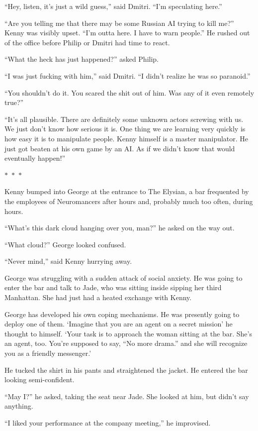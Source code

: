 \documentclass{memoir}
\newcommand{\starbreak}{%
\begin{center}
  $\ast$~$\ast$~$\ast$
\end{center}
}
\begin{document}
``Hey, listen, it's just a wild guess,'' said Dmitri. ``I'm speculating here.''

``Are you telling me that there may be some Russian AI trying to kill me?'' Kenny was visibly upset. ``I'm outta here. I have to warn people.'' He rushed out of the office before Philip or Dmitri had time to react.

``What the heck has just happened?'' asked Philip. 

``I was just fucking with him,'' said Dmitri. ``I didn't realize he was so paranoid.''

``You shouldn't do it. You scared the shit out of him. Was any of it even remotely true?''

``It's all plausible. There are definitely some unknown actors screwing with us. We just don't know how serious it is. One thing we are learning very quickly is how easy it is to manipulate people. Kenny himself is a master manipulator. He just got beaten at his own game by an AI. As if we didn't know that would eventually happen!''

\starbreak

Kenny bumped into George at the entrance to The Elysian, a bar frequented by the employees of Neuromancers after hours and, probably much too often, during hours.

``What's this dark cloud hanging over you, man?'' he asked on the way out.

``What cloud?'' George looked confused.

``Never mind,'' said Kenny hurrying away.

George was struggling with a sudden attack of social anxiety. He was going to enter the bar and talk to Jade, who was sitting inside sipping her third Manhattan. She had just had a heated exchange with Kenny. 

George has developed his own coping mechanisms. He was presently going to deploy one of them. `Imagine that you are an agent on a secret mission' he thought to himself. `Your task is to approach the woman sitting at the bar. She's an agent, too. You're supposed to say, ``No more drama.'' and she will recognize you as a friendly messenger.'

He tucked the shirt in his pants and straightened the jacket. He entered the bar looking semi-confident. 

``May I?'' he asked, taking the seat near Jade. She looked at him, but didn't say anything.

``I liked your performance at the company meeting,'' he improvised.
\end{document}
